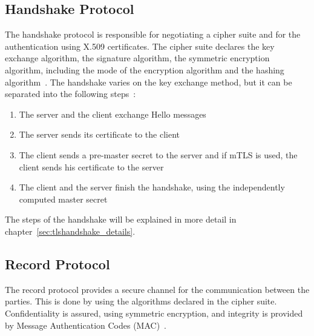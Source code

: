 \subsection{Handshake Protocol}
The handshake protocol is responsible for negotiating a cipher suite and for the authentication using X.509 certificates.
The cipher suite declares the key exchange algorithm, the signature algorithm, the symmetric encryption algorithm, including the mode of the encryption algorithm and the hashing algorithm~\cite{turnertls, kurbatov2021design}.
The handshake varies on the key exchange method, but it can be separated into the following steps~\cite{krawczyk2013security}:
\begin{enumerate}
    \item The server and the client exchange Hello messages
    \item The server sends its certificate to the client
    \item The client sends a pre-master secret to the server and if mTLS is used, the client sends his certificate to the server
    \item The client and the server finish the handshake, using the independently computed master secret
\end{enumerate}
The steps of the handshake will be explained in more detail in chapter~\ref{sec:tlshandshake_details}.

\subsection{Record Protocol}
The record protocol provides a secure channel for the communication between the parties.
This is done by using the algorithms declared in the cipher suite.
Confidentiality is assured, using symmetric encryption, and integrity is provided by Message Authentication Codes (MAC)~\cite{kurbatov2021design, krawczyk2013security}.


